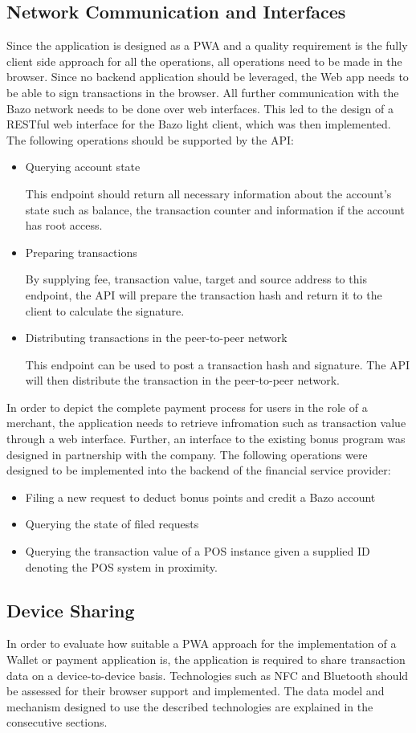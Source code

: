 \subsection{Network Communication and Interfaces}\label{networkandinterfaces}
Since the application is designed as a PWA and a quality requirement is the fully client side approach for all the operations, all operations need to be made in the browser. Since no backend application should be leveraged, the Web app needs to be able to sign transactions in the browser. All further communication with the Bazo network needs to be done over web interfaces. This led to the design of a RESTful web interface for the Bazo light client, which was then implemented. The following operations should be supported by the API:
\begin{itemize}
\item Querying account state

This endpoint should return all necessary information about the account's state such as balance, the transaction counter and information if the account has root access.
\item Preparing transactions

By supplying fee, transaction value, target and source address to this endpoint, the API will prepare the transaction hash and return it to the client to calculate the signature.
\item Distributing transactions in the peer-to-peer network

This endpoint can be used to post a transaction hash and signature. The API will then distribute the transaction in the peer-to-peer network.
\end{itemize}
In order to depict the complete payment process for users in the role of a merchant, the application needs to retrieve infromation such as transaction value through a web interface. Further, an interface to the existing bonus program was designed in partnership with the company. The following operations were designed to be implemented into the backend of the financial service provider:
\begin{itemize}
\item Filing a new request to deduct bonus points and credit a Bazo account
\item Querying the state of filed requests
\item Querying the transaction value of a POS instance given a supplied ID denoting the POS system in proximity.
\end{itemize}
\subsection{Device Sharing}
In order to evaluate how suitable a PWA approach for the implementation of a Wallet or payment application is, the application is required to share transaction data on a device-to-device basis. Technologies such as NFC and Bluetooth should be assessed for their browser support and implemented.
The data model and mechanism designed to use the described technologies are explained in the consecutive sections.


